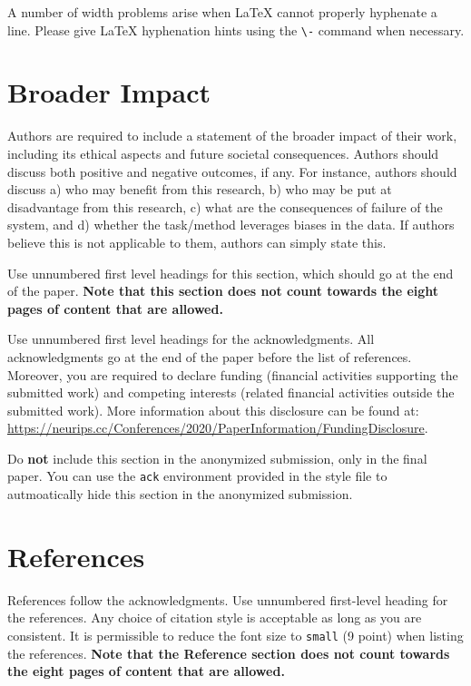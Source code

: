 \documentclass[10pt]{article}
\begin{document}
A number of width problems arise when \LaTeX{} cannot properly hyphenate a
line. Please give LaTeX hyphenation hints using the \verb+\-+ command when
necessary.


\section*{Broader Impact}

Authors are required to include a statement of the broader impact of their work,
including its ethical aspects and future societal consequences. 
Authors should discuss both positive and negative outcomes, if any. For instance,
authors should discuss a) 
who may benefit from this research, b) who may be put at disadvantage from this
research, c) what are the consequences of failure of the system, and d) whether
the task/method leverages biases in the data. If authors believe this is not
applicable to them, authors can simply state this.

Use unnumbered first level headings for this section, which should go at the
end of the paper. {\bf Note that this section does not count towards the eight
pages of content that are allowed.}

\begin{ack}
Use unnumbered first level headings for the acknowledgments. All acknowledgments
go at the end of the paper before the list of references. Moreover, you are
required to declare 
funding (financial activities supporting the submitted work) and competing
interests (related financial activities outside the submitted work). 
More information about this disclosure can be found at:
\url{https://neurips.cc/Conferences/2020/PaperInformation/FundingDisclosure}.


Do {\bf not} include this section in the anonymized submission, only in the
final paper. You can use the \texttt{ack} environment provided in the style
file to autmoatically hide this section in the anonymized submission.
\end{ack}

\section*{References}

References follow the acknowledgments. Use unnumbered first-level heading for
the references. Any choice of citation style is acceptable as long as you are
consistent. It is permissible to reduce the font size to \verb+small+ (9 point)
when listing the references.
{\bf Note that the Reference section does not count towards the eight pages of
content that are allowed.}
\medskip
\end{document}

